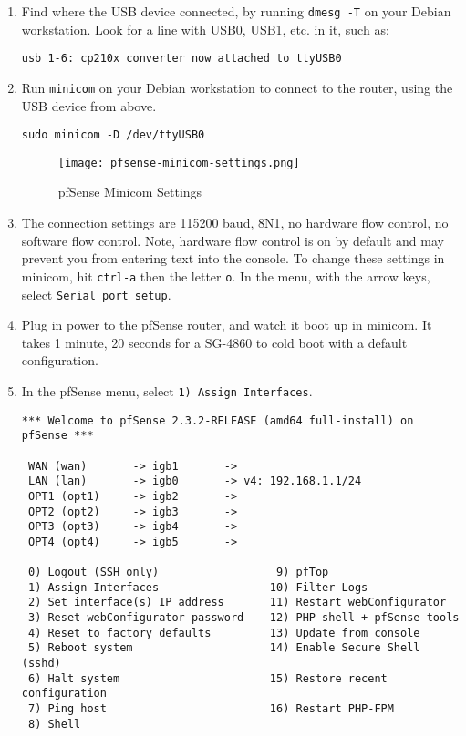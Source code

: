 \begin{enumerate}
 \item Find where the USB device connected, by running \texttt{dmesg -T} on your Debian workstation.
Look for a line with USB0, USB1, etc. in it, such as:
\begin{verbatim}
usb 1-6: cp210x converter now attached to ttyUSB0
\end{verbatim}
 \item Run \texttt{minicom} on your Debian workstation to connect to the router, using the USB device from above.
\begin{verbatim}
sudo minicom -D /dev/ttyUSB0
\end{verbatim}

\begin{figure}[h!]
\texttt{[image: pfsense-minicom-settings.png]}
 \caption{pfSense Minicom Settings}
 \label{fig:pfsense-minicom-settings}
\end{figure}
 \item The connection settings are 115200 baud, 8N1, no hardware flow control, no software flow control. Note, hardware flow control is on by default and may prevent you from entering text into the console. To change these settings in minicom, hit \texttt{ctrl-a} then the letter \texttt{o}. In the menu, with the arrow keys, select \texttt{Serial port setup}.
 \item Plug in power to the pfSense router, and watch it boot up in minicom. It takes 1 minute, 20 seconds for a SG-4860 to cold boot with a default configuration.
 \item In the pfSense menu, select \texttt{1) Assign Interfaces}.
\begin{verbatim}
*** Welcome to pfSense 2.3.2-RELEASE (amd64 full-install) on pfSense ***

 WAN (wan)       -> igb1       -> 
 LAN (lan)       -> igb0       -> v4: 192.168.1.1/24
 OPT1 (opt1)     -> igb2       -> 
 OPT2 (opt2)     -> igb3       -> 
 OPT3 (opt3)     -> igb4       -> 
 OPT4 (opt4)     -> igb5       -> 

 0) Logout (SSH only)                  9) pfTop
 1) Assign Interfaces                 10) Filter Logs
 2) Set interface(s) IP address       11) Restart webConfigurator
 3) Reset webConfigurator password    12) PHP shell + pfSense tools
 4) Reset to factory defaults         13) Update from console
 5) Reboot system                     14) Enable Secure Shell (sshd)
 6) Halt system                       15) Restore recent configuration
 7) Ping host                         16) Restart PHP-FPM
 8) Shell
  

\end{verbatim}
\end{enumerate}
